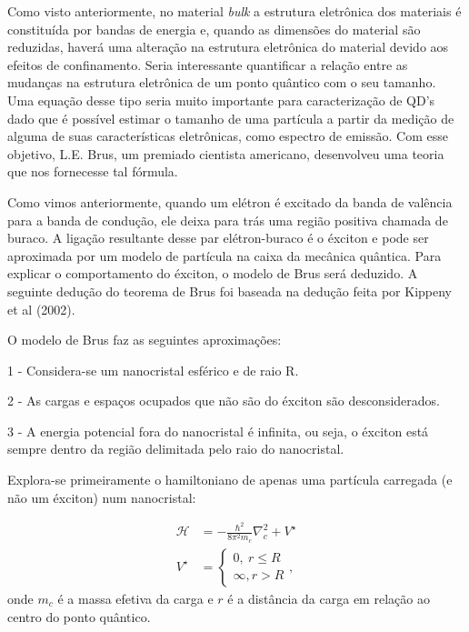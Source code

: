 
\par Como visto anteriormente, no material \textit{bulk} a estrutura eletrônica dos materiais é constituída por  bandas de energia  e, quando as dimensões do material são reduzidas, haverá uma alteração na estrutura eletrônica do material devido aos efeitos de confinamento. Seria interessante quantificar a relação entre as mudanças na estrutura eletrônica de um ponto quântico com o seu tamanho. Uma equação desse tipo seria muito importante para caracterização de QD’s dado que é possível estimar o tamanho de uma partícula a partir da medição de alguma de suas características eletrônicas, como espectro de emissão. Com esse objetivo, L.E. Brus, um premiado cientista americano, desenvolveu uma teoria que nos fornecesse tal fórmula.

\par Como vimos anteriormente, quando um elétron é excitado da banda de valência para a banda de condução, ele deixa para trás uma região positiva chamada de buraco. A ligação resultante desse par elétron-buraco é o éxciton e pode ser aproximada por um modelo de partícula na caixa da mecânica quântica. Para explicar o comportamento do éxciton, o modelo de Brus será deduzido. A seguinte dedução do teorema de Brus foi baseada na dedução feita por Kippeny et al (2002).

\par O modelo de Brus faz as seguintes aproximações: 

\par 1 - Considera-se um nanocristal esférico e de raio R.

\par 2 - As cargas e espaços ocupados que não são do éxciton são desconsiderados.

\par 3 - A energia potencial fora do nanocristal é infinita, ou seja, o éxciton está sempre dentro da região delimitada pelo raio do nanocristal.

\par Explora-se primeiramente o hamiltoniano de apenas uma partícula carregada (e não um éxciton) num nanocristal:

\begin{align}
	\label{confinamento_9}
	\displaystyle \mathcal{H} &= -\frac{\hbar^2}{8\pi^2m_{c}}\nabla^2_{c} + V^{\star}\\
	\displaystyle 
		V^{\star} &=
		\left\{
          \begin{array}{ll}
            \displaystyle 0,\ r \leq R\\
            \displaystyle \infty, r > R
          \end{array}
        \right.
        ,
\end{align}
onde $m_{c}$ é a massa efetiva da carga e $r$ é a distância da carga em relação ao centro do ponto quântico.

